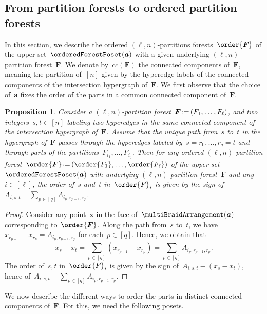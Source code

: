 \documentclass{amsart}
\newtheorem{proposition}[theorem]{Proposition}
\theoremstyle{definition}
\renewcommand{\b}[1]{{\boldsymbol{#1}}} %
\newcommand{\eqdef}{\mbox{\,\raisebox{0.2ex}{\scriptsize\ensuremath{\mathrm:}}\ensuremath{=}\,}} %
\renewcommand{\b}[1]{\boldsymbol{#1}} %
\begin{document}

\subsection{From partition forests to ordered partition forests}
\label{subsec:PFtoOPF}

In this section, we describe the ordered $(\ell,n)$-partitions forests~$\order{\b{F}}$ of the upper set~$\orderedForestPoset(\b{a})$ with a given underlying $(\ell,n)$-partition forest~$\b{F}$.
We denote by~$cc(\b{F})$ the connected components of~$\b{F}$, meaning the partition of~$[n]$ given by the hyperedge labels of the connected components of the intersection hypergraph of~$\b{F}$.
We first observe that the choice of~$\b{a}$ fixes the order of the parts in a common connected component of~$\b{F}$.

\begin{proposition}
\label{prop:PFtoOPF1}
Consider a $(\ell,n)$-partition forest~$\b{F} \eqdef (F_1, \dots, F_\ell)$, and two integers~$s,t \in [n]$ labeling two hyperedges in the same connected component of the intersection hypergraph of~$\b{F}$.
Assume that the unique path from~$s$ to~$t$ in the hypergraph of~$\b{F}$ passes through the hyperedges labeled by~$s = r_0, \dots, r_q = t$ and through parts of the partitions~$F_{i_1}, \dots, F_{i_q}$.
Then for any ordered $(\ell,n)$-partition forest~$\order{\b{F}} \eqdef (\order{F_1}, \dots, \order{F_\ell})$ of the upper set~$\orderedForestPoset(\b{a})$ with underlying $(\ell,n)$-partition forest~$\b{F}$ and any~$i \in [\ell]$, the order of~$s$ and~$t$ in~$\order{F}_i$ is given by the sign of~$A_{i,s,t} - \sum_{p \in [q]} A_{i_p, r_{p-1}, r_p}$.
\end{proposition}

\begin{proof}
Consider any point~$\b{x}$ in the face of~$\multiBraidArrangement(\b{a})$ corresponding to~$\order{\b{F}}$.
Along the path from~$s$ to~$t$, we have~$x_{r_{p-1}} - x_{r_p} = A_{i_p, r_{p-1}, r_p}$ for each~$p \in [q]$.
Hence, we obtain that
\[
x_s - x_t = \sum_{p \in [q]}  (x_{r_{p-1}} - x_{r_p}) = \sum_{p \in [q]} A_{i_p, r_{p-1}, r_p}.
\]
The order of~$s,t$ in~$\order{F}_i$ is given by the sign of~$A_{i,s,t} - (x_s - x_t)$, hence of~$A_{i,s,t} - \sum_{p \in [q]} A_{i_p, r_{p-1}, r_p}$.
\end{proof}

We now describe the different ways to order the parts in distinct connected components of~$\b{F}$.
For this, we need the following posets.
\end{document}
